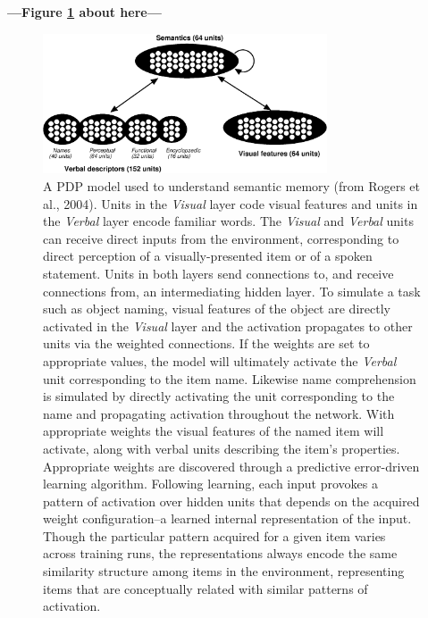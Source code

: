 \begin{center}
\textbf{---Figure \ref{fig.sem_net} about here---}
\end{center}


\begin{figure}
\centering
\includegraphics[width=0.75\textwidth]{figures/semantic_model.eps}
\caption{\label{fig.sem_net} A PDP model used to understand semantic memory (from Rogers et al., 2004). Units in the {\em Visual} layer code visual features and units in the {\em Verbal} layer encode familiar words. The {\em Visual} and {\em Verbal} units can receive direct inputs from the environment, corresponding to direct perception of a visually-presented item or of a spoken statement. Units in both layers send connections to, and receive connections from, an intermediating hidden layer. To simulate a task such as object naming, visual features of the object are directly activated in the {\em Visual} layer and the activation propagates to other units via the weighted connections. If the weights are set to appropriate values, the model will ultimately activate the {\em Verbal} unit corresponding to the item name. Likewise name comprehension is simulated by directly activating the unit corresponding to the name and propagating activation throughout the network. With appropriate weights the visual features of the named item will activate, along with verbal units describing the item's properties.  Appropriate weights are discovered through a predictive error-driven  learning algorithm. Following learning, each input provokes a pattern of activation over hidden units that depends on the acquired weight configuration--a learned internal representation of the input. Though the particular pattern acquired for a given item varies across training runs, the representations always encode the same similarity structure among items in the environment, representing items that are conceptually related with similar patterns of activation.}
\end{figure}


